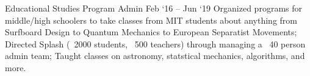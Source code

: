 \experience
    {Educational Studies Program}
    {Admin}
    {Feb `16 -- Jun `19}
    {
        Organized programs for middle/high schoolers to take classes from MIT students about
        anything from Surfboard Design to Quantum Mechanics to European Separatist Movements;
        Directed Splash (~2000 students, ~500 teachers) through managing a ~40 person admin team;
        Taught classes on astronomy, statstical mechanics, algorithms, and more.
    }
